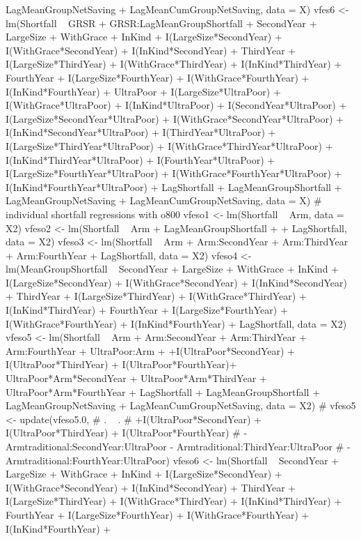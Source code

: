 \begin{Schunk}
\begin{Sinput}
  LagMeanGroupNetSaving + LagMeanCumGroupNetSaving,
  data = X)
vfes6 <- lm(Shortfall ~ 
  GRSR + GRSR:LagMeanGroupShortfall + 
  SecondYear + LargeSize + WithGrace + InKind +
  I(LargeSize*SecondYear) + I(WithGrace*SecondYear) + I(InKind*SecondYear) + 
  ThirdYear +
  I(LargeSize*ThirdYear) + I(WithGrace*ThirdYear) + I(InKind*ThirdYear) +
  FourthYear +
  I(LargeSize*FourthYear) + I(WithGrace*FourthYear) + I(InKind*FourthYear) +
  UltraPoor + 
  I(LargeSize*UltraPoor) + I(WithGrace*UltraPoor) + I(InKind*UltraPoor) + 
  I(SecondYear*UltraPoor) +
  I(LargeSize*SecondYear*UltraPoor) + I(WithGrace*SecondYear*UltraPoor) + 
  I(InKind*SecondYear*UltraPoor) + 
  I(ThirdYear*UltraPoor) +
  I(LargeSize*ThirdYear*UltraPoor) + I(WithGrace*ThirdYear*UltraPoor) + 
  I(InKind*ThirdYear*UltraPoor) + 
  I(FourthYear*UltraPoor) +
  I(LargeSize*FourthYear*UltraPoor) + I(WithGrace*FourthYear*UltraPoor) + 
  I(InKind*FourthYear*UltraPoor) + 
  LagShortfall + LagMeanGroupShortfall +
  LagMeanGroupNetSaving + LagMeanCumGroupNetSaving,
  data = X)
# individual shortfall regressions with o800
vfeso1 <- lm(Shortfall  ~ Arm, data = X2)
vfeso2 <- lm(Shortfall  ~ 
   Arm + LagMeanGroupShortfall + 
  + LagShortfall, data = X2)
vfeso3 <- lm(Shortfall  ~ 
  Arm + Arm:SecondYear + Arm:ThirdYear + Arm:FourthYear
  + LagShortfall, 
  data = X2)
vfeso4 <- lm(MeanGroupShortfall ~  
  SecondYear + LargeSize + WithGrace + InKind +
  I(LargeSize*SecondYear) + I(WithGrace*SecondYear) + I(InKind*SecondYear) + 
  ThirdYear +
  I(LargeSize*ThirdYear) + I(WithGrace*ThirdYear) + I(InKind*ThirdYear) +
  FourthYear +
  I(LargeSize*FourthYear) + I(WithGrace*FourthYear) + I(InKind*FourthYear)
  + LagShortfall, 
  data = X2)
vfeso5 <- lm(Shortfall ~ 
  Arm + 
  Arm:SecondYear + Arm:ThirdYear + Arm:FourthYear +
  UltraPoor:Arm + 
  +I(UltraPoor*SecondYear) + I(UltraPoor*ThirdYear) + I(UltraPoor*FourthYear)+
  UltraPoor*Arm*SecondYear + UltraPoor*Arm*ThirdYear + UltraPoor*Arm*FourthYear +
  LagShortfall + LagMeanGroupShortfall +
  LagMeanGroupNetSaving + LagMeanCumGroupNetSaving,
  data = X2)
# vfeso5 <- update(vfeso5.0,
#   . ~ .
#   +I(UltraPoor*SecondYear) + I(UltraPoor*ThirdYear) + I(UltraPoor*FourthYear)
#   - Armtraditional:SecondYear:UltraPoor - Armtraditional:ThirdYear:UltraPoor
#   - Armtraditional:FourthYear:UltraPoor)
vfeso6 <- lm(Shortfall ~ 
  SecondYear + LargeSize + WithGrace + InKind +
  I(LargeSize*SecondYear) + I(WithGrace*SecondYear) + I(InKind*SecondYear) + 
  ThirdYear +
  I(LargeSize*ThirdYear) + I(WithGrace*ThirdYear) + I(InKind*ThirdYear) +
  FourthYear +
  I(LargeSize*FourthYear) + I(WithGrace*FourthYear) + I(InKind*FourthYear) +

\end{Sinput}
\end{Schunk}
